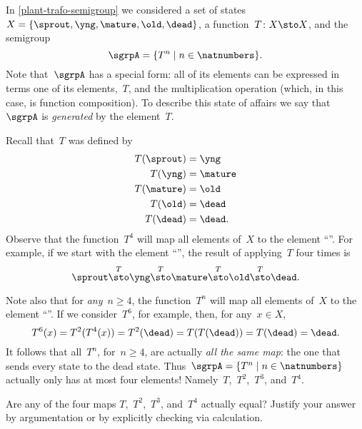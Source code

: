 
\clearmargin

\section{}


In \cref{plant-trafo-semigroup} we considered a set of states~$X = \{ \sprout, \yng, \mature, \old, \dead \}$, a function~$T\colon X \sto X$, and the semigroup
\begin{equation}\label{trafo-sgrp-one-gen}
\sgrpA = \{ T^n \mid n \in \natnumbers \}.
\end{equation}
Note that~$\sgrpA$ has a special form: all of its elements can be expressed in terms one of its elements,~$T$, and the multiplication operation (which, in this case, is function composition).
To describe this state of affairs we say that~$\sgrpA$ is \emph{generated} by the element~$T$.


Recall that~$T$ was defined by
\begin{align*}
T(\sprout) &=  \yng \\
T(\yng) &=  \mature \\
T(\mature) &=  \old \\
T( \old) &= \dead \\
T (\dead) &= \dead.
\end{align*}
Observe that the function~$T^4$ will map all elements of~$X$ to the element ``\dead''. For example, if we start with the element ``\sprout'', the result of applying~$T$ four times is
\begin{equation*}
\sprout \overset{T}{\sto} \yng \overset{T}{\sto} \mature \overset{T}{\sto} \old \overset{T}{\sto} \dead.
\end{equation*}

Note also that for \emph{any}~$n \geq 4$, the function~$T^n$ will map all elements of~$X$ to the element ``\dead''.
If we consider~$T^6$, for example, then, for any~$x \in X$,
\begin{equation*}
T^6(x) = T^2(T^4(x)) = T^2(\dead) = T(T(\dead)) = T(\dead) = \dead.
\end{equation*}
It follows that all~$T^n$, for~$n \geq 4$, are actually \emph{all the same map}: the one that sends every state to the dead state.
Thus~$\sgrpA = \{ T^n \mid n \in \natnumbers \}$ actually only has at most four elements! Namely~$T$,~$T^2$,~$T^3$, and~$T^4$.

\begin{gradedexercise}
Are any of the four maps $T$,~$T^2$,~$T^3$, and~$T^4$ actually equal? Justify your answer by argumentation or by explicitly checking via calculation.
\end{gradedexercise}

